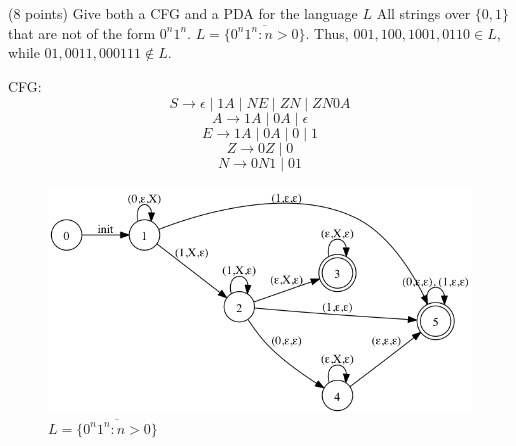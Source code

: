 \documentclass[paper=a4, fontsize=11pt]{scrartcl} %
\begin{document}
\pagebreak

\section{}

\begin{fancyquotes}
  (8 points) Give both a CFG and a PDA for the language $L$ All
  strings over $\{0,1\}$ that are not of the form $0^n1^n$. $L =
  \overline{\{0^n1^n : n > 0\}}$. Thus, $001, 100, 1001, 0110 \in L$,
  while $01, 0011, 000111 \not\in L$.
\end{fancyquotes}

CFG:
$$S\rightarrow \epsilon \mid 1A \mid NE \mid ZN \mid ZN0A$$
$$A\rightarrow 1A \mid 0A \mid \epsilon$$
$$E\rightarrow 1A \mid 0A \mid 0 \mid 1$$
$$Z\rightarrow 0Z \mid 0$$
$$N\rightarrow 0N1 \mid 01$$

\begin{figure}[hp]
  \centering
  \includegraphics[width=\textwidth]{5-3.gv.png}
  \caption{$L = \overline{\{0^n1^n : n > 0\}}$}
\end{figure}
\end{document}
